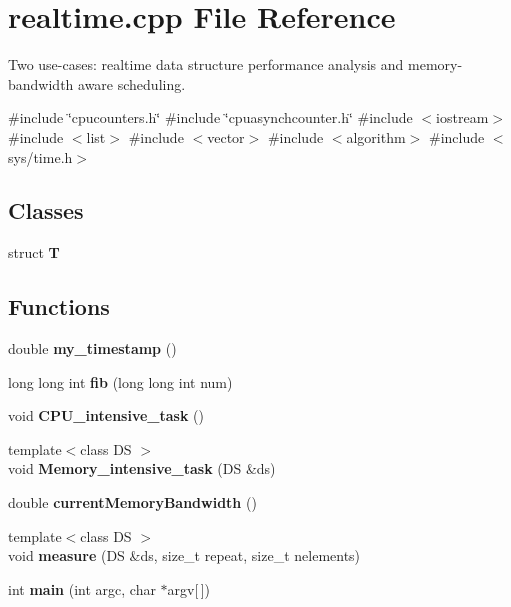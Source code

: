 \section{realtime.\+cpp File Reference}
\label{realtime_8cpp}


Two use-\/cases\+: realtime data structure performance analysis and memory-\/bandwidth aware scheduling.  


{\ttfamily \#include \char`\"{}cpucounters.\+h\char`\"{}}\newline
{\ttfamily \#include \char`\"{}cpuasynchcounter.\+h\char`\"{}}\newline
{\ttfamily \#include $<$iostream$>$}\newline
{\ttfamily \#include $<$list$>$}\newline
{\ttfamily \#include $<$vector$>$}\newline
{\ttfamily \#include $<$algorithm$>$}\newline
{\ttfamily \#include $<$sys/time.\+h$>$}\newline
\subsection*{Classes}
\begin{DoxyCompactItemize}
\item 
struct \textbf{ T}
\end{DoxyCompactItemize}
\subsection*{Functions}
\begin{DoxyCompactItemize}
\item 
\mbox{\label{realtime_8cpp_ab6b2adca133c5e31dca366cdc686edbe}} 
double {\bfseries my\+\_\+timestamp} ()
\item 
\mbox{\label{realtime_8cpp_a26067fd04774b9351f8ad25314b01077}} 
long long int {\bfseries fib} (long long int num)
\item 
\mbox{\label{realtime_8cpp_ae78e322a91d8697aeb883161ad21e77b}} 
void {\bfseries C\+P\+U\+\_\+intensive\+\_\+task} ()
\item 
\mbox{\label{realtime_8cpp_a722f2b5a21f9cb12dae7790963a0cdba}} 
{\footnotesize template$<$class DS $>$ }\\void {\bfseries Memory\+\_\+intensive\+\_\+task} (DS \&ds)
\item 
\mbox{\label{realtime_8cpp_a48c3e8e5a58ab1456c875c332a2df4b9}} 
double {\bfseries current\+Memory\+Bandwidth} ()
\item 
\mbox{\label{realtime_8cpp_a6e4dd9241429371cfcb1d2b3127ea7a8}} 
{\footnotesize template$<$class DS $>$ }\\void {\bfseries measure} (DS \&ds, size\+\_\+t repeat, size\+\_\+t nelements)
\item 
\mbox{\label{realtime_8cpp_a0ddf1224851353fc92bfbff6f499fa97}} 
int {\bfseries main} (int argc, char $\ast$argv[$\,$])
\end{DoxyCompactItemize}
